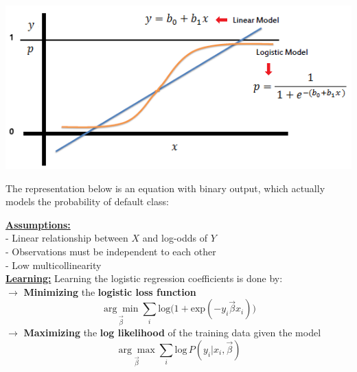 \documentclass[letterpaper, 10.5pt,landscape]{article}
\begin{document}
\begin{multicols*}{3}
\vspace{-5pt}
\begin{center}
    \begin{minipage}{0.86\linewidth}
    \includegraphics[width=\textwidth]{figures/logistic_function_regression.PNG}
    \end{minipage}
\end{center}

\vspace{-5pt}
The representation below is an equation with binary output, which actually models the probability of default class: 


\vspace{2pt}
\textbf{\underline{Assumptions:}} \\
- Linear relationship between $X$ and log-odds of $Y$ \\
- Observations must be independent to each other \\
- Low multicollinearity \\



\vspace{2pt}
\textbf{\underline{Learning:}} Learning the logistic regression coefficients is done by: \\

$\rightarrow$ \textbf{Minimizing} the \textbf{logistic loss function} 
\vspace{-5pt}
\[\boxed{\underset{\vec{\beta}} {\arg\min} \sum_{i} \text{log}\big(1+\text{exp}(-y_{i} \vec{\beta}x_{i}) \big)} \] 
$\rightarrow$ \textbf{Maximizing} the \textbf{log likelihood} of the training data given the model 
\vspace{-5pt}
\[\boxed{\underset{\vec{\beta}} {\arg\max} \sum_{i} \text{log} \hspace{2pt} P\left(y_{i} | x_{i}, \vec{\beta} \right)} \]












\end{multicols*}
\end{document}
